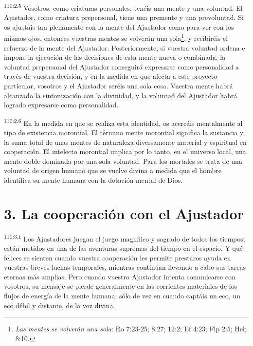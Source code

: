 \par
\textsuperscript{110:2.5} Vosotros, como criaturas personales, tenéis una mente y una voluntad. El Ajustador, como criatura prepersonal, tiene una premente y una prevoluntad. Si os ajustáis tan plenamente con la mente del Ajustador como para ver con los mismos ojos, entonces vuestras mentes se volverán una sola\footnote{\textit{Las mentes se volverán una sola}: Ro 7:23-25; 8:27; 12:2; Ef 4:23; Flp 2:5; Heb 8:10.}, y recibiréis el refuerzo de la mente del Ajustador. Posteriormente, si vuestra voluntad ordena e impone la ejecución de las decisiones de esta mente nueva o combinada, la voluntad prepersonal del Ajustador conseguirá expresarse como personalidad a través de vuestra decisión, y en la medida en que afecta a este proyecto particular, vosotros y el Ajustador seréis una sola cosa. Vuestra mente habrá alcanzado la sintonización con la divinidad, y la voluntad del Ajustador habrá logrado expresarse como personalidad.

\par
\textsuperscript{110:2.6} En la medida en que se realiza esta identidad, os acercáis mentalmente al tipo de existencia morontial. El término mente morontial significa la sustancia y la suma total de unas mentes de naturaleza diversamente material y espiritual en cooperación. El intelecto morontial implica por lo tanto, en el universo local, una mente doble dominada por una sola voluntad. Para los mortales se trata de una voluntad de origen humano que se vuelve divina a medida que el hombre identifica su mente humana con la dotación mental de Dios.

\section*{3. La cooperación con el Ajustador}
\par
\textsuperscript{110:3.1} Los Ajustadores juegan el juego magnífico y sagrado de todos los tiempos; están metidos en una de las aventuras supremas del tiempo en el espacio. Y qué felices se sienten cuando vuestra cooperación les permite prestaros ayuda en vuestras breves luchas temporales, mientras continúan llevando a cabo sus tareas eternas más amplias. Pero cuando vuestro Ajustador intenta comunicarse con vosotros, su mensaje se pierde generalmente en las corrientes materiales de los flujos de energía de la mente humana; sólo de vez en cuando captáis un eco, un eco débil y distante, de la voz divina.

